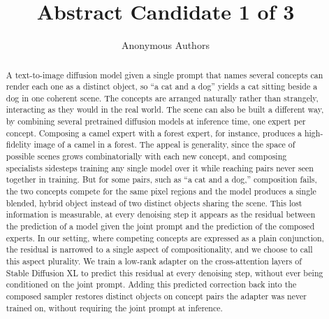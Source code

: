 \documentclass{article}
\title{Abstract Candidate 1 of 3}
\author{Anonymous Authors}
\begin{document}
\maketitle

\begin{abstract}
A text-to-image diffusion model given a single prompt that names several concepts can render each one as a distinct object, so ``a cat and a dog'' yields a cat sitting beside a dog in one coherent scene. The concepts are arranged naturally rather than strangely, interacting as they would in the real world. The scene can also be built a different way, by combining several pretrained diffusion models at inference time, one expert per concept. Composing a camel expert with a forest expert, for instance, produces a high-fidelity image of a camel in a forest. The appeal is generality, since the space of possible scenes grows combinatorially with each new concept, and composing specialists sidesteps training any single model over it while reaching pairs never seen together in training. But for some pairs, such as ``a cat and a dog,'' composition fails, the two concepts compete for the same pixel regions and the model produces a single blended, hybrid object instead of two distinct objects sharing the scene. This lost information is measurable, at every denoising step it appears as the residual between the prediction of a model given the joint prompt and the prediction of the composed experts. In our setting, where competing concepts are expressed as a plain conjunction, the residual is narrowed to a single aspect of compositionality, and we choose to call this aspect plurality. We train a low-rank adapter on the cross-attention layers of Stable Diffusion XL to predict this residual at every denoising step, without ever being conditioned on the joint prompt. Adding this predicted correction back into the composed sampler restores distinct objects on concept pairs the adapter was never trained on, without requiring the joint prompt at inference.
\end{abstract}
\end{document}
